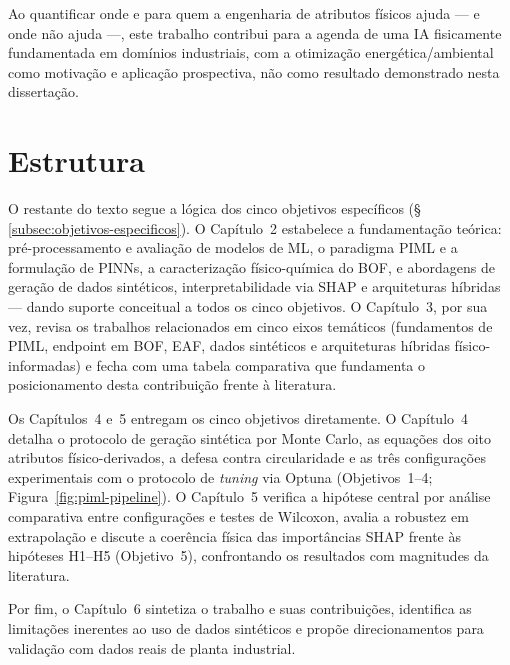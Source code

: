 Ao quantificar onde e para quem a engenharia de atributos físicos ajuda — e onde não ajuda —, este trabalho contribui para a agenda de uma IA fisicamente fundamentada em domínios industriais, com a otimização energética/ambiental como motivação e aplicação prospectiva, não como resultado demonstrado nesta dissertação.

\section{Estrutura}
\label{sec:estrutura}

O restante do texto segue a lógica dos cinco objetivos específicos (§\,\ref{subsec:objetivos-especificos}). O Capítulo~2 estabelece a fundamentação teórica: pré-processamento e avaliação de modelos de ML, o paradigma PIML e a formulação de PINNs, a caracterização físico-química do BOF, e abordagens de geração de dados sintéticos, interpretabilidade via SHAP e arquiteturas híbridas — dando suporte conceitual a todos os cinco objetivos. O Capítulo~3, por sua vez, revisa os trabalhos relacionados em cinco eixos temáticos (fundamentos de PIML, endpoint em BOF, EAF, dados sintéticos e arquiteturas híbridas físico-informadas) e fecha com uma tabela comparativa que fundamenta o posicionamento desta contribuição frente à literatura.

Os Capítulos~4 e~5 entregam os cinco objetivos diretamente. O Capítulo~4 detalha o protocolo de geração sintética por Monte Carlo, as equações dos oito atributos físico-derivados, a defesa contra circularidade e as três configurações experimentais com o protocolo de \textit{tuning} via Optuna (Objetivos~1--4; Figura~\ref{fig:piml-pipeline}). O Capítulo~5 verifica a hipótese central por análise comparativa entre configurações e testes de Wilcoxon, avalia a robustez em extrapolação e discute a coerência física das importâncias SHAP frente às hipóteses H1--H5 (Objetivo~5), confrontando os resultados com magnitudes da literatura.

Por fim, o Capítulo~6 sintetiza o trabalho e suas contribuições, identifica as limitações inerentes ao uso de dados sintéticos e propõe direcionamentos para validação com dados reais de planta industrial.